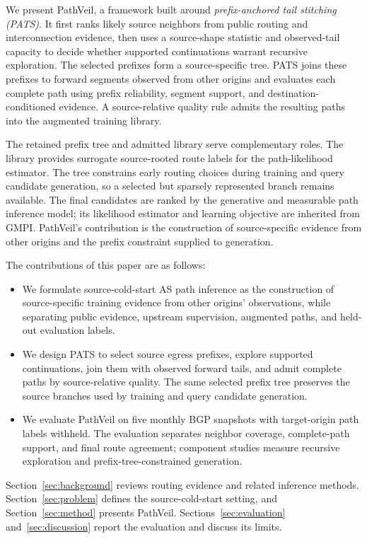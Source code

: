\documentclass[conference]{IEEEtran}
\newcommand{\sys}{\mbox{PathVeil}\xspace}
\newcommand{\pats}{\mbox{PATS}\xspace}
\begin{document}
We present \sys, a framework built around \emph{prefix-anchored tail
stitching (\pats)}. It first ranks likely source neighbors from public
routing and interconnection evidence, then uses a source-shape statistic
and observed-tail capacity to decide whether supported continuations
warrant recursive exploration. The selected prefixes form a
source-specific tree. \pats joins these prefixes to forward segments
observed from other origins and evaluates each complete path using prefix
reliability, segment support, and destination-conditioned evidence. A
source-relative quality rule admits the resulting paths into the
augmented training library.

The retained prefix tree and admitted library serve complementary roles.
The library provides surrogate source-rooted route labels for the
path-likelihood estimator. The tree constrains early routing choices during
training and query candidate generation, so a selected but sparsely
represented branch remains available. The final candidates are ranked by
the generative and measurable path inference model; its likelihood
estimator and learning objective are inherited from GMPI. PathVeil's
contribution is the construction of source-specific evidence from other
origins and the prefix constraint supplied to generation.

The contributions of this paper are as follows:
\begin{itemize}
\item We formulate source-cold-start AS path inference as the construction
of source-specific training evidence from other origins' observations,
while separating public evidence, upstream supervision, augmented paths,
and held-out evaluation labels.
\item We design \pats to select source egress prefixes, explore supported
continuations, join them with observed forward tails, and admit complete
paths by source-relative quality. The same selected prefix tree preserves
the source branches used by training and query candidate generation.
\item We evaluate \sys on five monthly BGP snapshots with target-origin
path labels withheld. The evaluation separates neighbor coverage,
complete-path support, and final route agreement; component studies
measure recursive exploration and prefix-tree-constrained generation.
\end{itemize}

Section~\ref{sec:background} reviews routing evidence and related
inference methods. Section~\ref{sec:problem} defines the source-cold-start
setting, and Section~\ref{sec:method} presents \sys. Sections~\ref{sec:evaluation}
and~\ref{sec:discussion} report the evaluation and discuss its limits.
\end{document}
